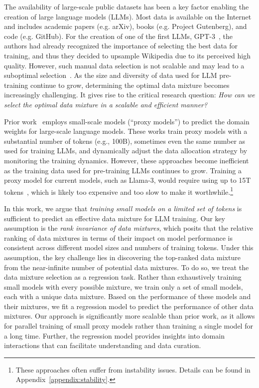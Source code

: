 \documentclass{article}
\theoremstyle{definition}
\theoremstyle{remark}
\begin{document}
The availability of large-scale public datasets has been a key factor enabling the creation of large language models (LLMs). Most data is available on the Internet and includes academic papers (e.g. arXiv), books (e.g. Project Gutenberg), and code (e.g. GitHub). For the creation of one of the first LLMs, GPT-3~\citep{gpt3paper}, the authors had already recognized the importance of selecting the best data for training, and thus they decided to upsample Wikipedia due to its perceived high quality. However, such manual data selection is not scalable and may lead to a suboptimal selection~\citep{albalak2024survey}.
As the size and diversity of data used for LLM pre-training continue to grow, determining the optimal data mixture becomes increasingly challenging.
It gives rise to the critical research question: \textit{How can we select the optimal data mixture in a scalable and efficient manner?} 

Prior work~\citep{xie2023doremi,fan2023doge,albalak2023efficient} employs small-scale models (``proxy models'') to predict the domain weights for large-scale language models. These works train proxy models with a substantial number of tokens (e.g., 100B), sometimes even the same number as used for training LLMs, and dynamically adjust the data allocation strategy by monitoring the training dynamics. However, these approaches become inefficient as the training data used for pre-training LLMs continues to grow.
Training a proxy model for current models, such as Llama-3, would require using up to 15T tokens~\citep{meta_llama_3_2024}, which is likely too expensive and too slow to make it worthwhile.\footnote{These approaches often suffer from instability issues. Details can be found in Appendix~\ref{appendix:stability}.}

In this work, we argue that \textit{training small models on a limited set of tokens} is sufficient to predict an effective data mixture for LLM training. Our key assumption is the \textit{rank invariance of data mixtures}, which posits that the relative ranking of data mixtures in terms of their impact on model performance is consistent across different model sizes and numbers of training tokens. Under this assumption, the key challenge lies in discovering the top-ranked data mixture from the near-infinite number of potential data mixtures. To do so, we treat the data mixture selection as a regression task. Rather than exhaustively training small models with every possible mixture, we train only a set of small models, each with a unique data mixture. Based on the performance of these models and their mixtures, we fit a regression model to predict the performance of other data mixtures. Our approach is significantly more scalable than prior work, as it allows for parallel training of small proxy models rather than training a single model for a long time. Further, the regression model provides insights into domain interactions that can facilitate understanding and data curation. 
\end{document}

